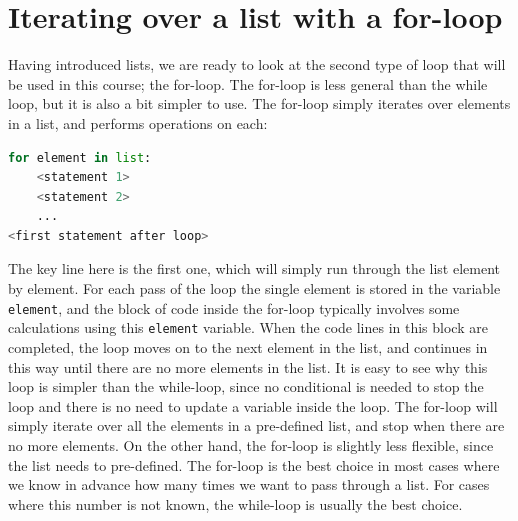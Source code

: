 \documentclass[graybox,envcountchap,sectrefs,final]{svmonodo}
\begin{document}
\section{Iterating over a list with a for-loop}
Having introduced lists, we are ready to look at the second type of loop that will be used in this course; the for-loop. The
for-loop is less general than the while loop, but it is also a bit simpler to use. The for-loop simply iterates over elements
in a list, and performs operations on each:
\begin{lstlisting}[language=Python,style=blue1]
for element in list:
    <statement 1>
    <statement 2>
    ...
<first statement after loop>
\end{lstlisting}
The key line here is the first one, which will simply run through the list element by element. For each pass of the loop the single element
is stored in the variable \texttt{element}, and the block of code inside the for-loop typically involves some calculations using this
\texttt{element} variable. When the code lines in this block are completed, the loop moves on to the next element in the list, and continues in this
way until there are no more elements in the list.
It is easy to see why this loop is simpler than the while-loop, since no conditional is needed to stop the loop and there
is no need to update a variable inside the loop. The for-loop will simply iterate over all the elements in a pre-defined list,
and stop when there are no more elements. On the other hand, the for-loop is slightly less flexible, since the list needs to
pre-defined. The for-loop is the best choice in most cases where we know in advance how many times we want to pass through a list.
For cases where this number is not known, the while-loop is usually the best choice.
\end{document}

